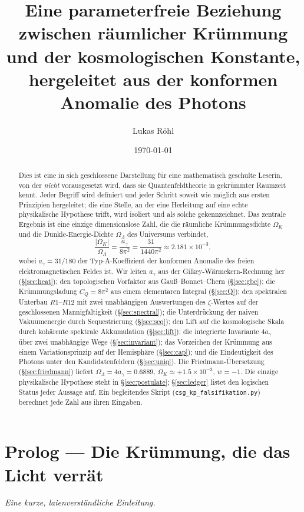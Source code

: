 \documentclass[11pt,a4paper]{article}
\title{Eine parameterfreie Beziehung zwischen räumlicher Krümmung\\
und der kosmologischen Konstante,\\
hergeleitet aus der konformen Anomalie des Photons}
\author{Lukas Röhl}
\date{\today}
\theoremstyle{definition}
\theoremstyle{remark}
\newcommand{\ag}{a_\gamma}
\newcommand{\CQ}{C_Q}
\newcommand{\Ok}{\Omega_K}
\newcommand{\OL}{\Omega_\Lambda}
\begin{document}
\maketitle

\begin{abstract}
Dies ist eine in sich geschlossene Darstellung für eine mathematisch geschulte Leserin, von der
\emph{nicht} vorausgesetzt wird, dass sie Quantenfeldtheorie in gekrümmter Raumzeit kennt. Jeder
Begriff wird definiert und jeder Schritt soweit wie möglich aus ersten Prinzipien hergeleitet; die
eine Stelle, an der eine Herleitung auf eine echte physikalische Hypothese trifft, wird isoliert und
als solche gekennzeichnet. Das zentrale Ergebnis ist eine einzige dimensionslose Zahl, die die
räumliche Krümmungsdichte $\Ok$ und die Dunkle-Energie-Dichte $\OL$ des Universums verbindet,
\[
\frac{\lvert\Ok\rvert}{\OL}=\frac{\ag}{8\pi^2}=\frac{31}{1440\pi^2}\approx 2.181\times10^{-3},
\]
wobei $\ag=31/180$ der Typ-A-Koeffizient der konformen Anomalie des freien elektromagnetischen
Feldes ist. Wir leiten $\ag$ aus der Gilkey-Wärmekern-Rechnung her (\S\ref{sec:heat}); den
topologischen Vorfaktor aus Gauß--Bonnet--Chern (\S\ref{sec:gbc}); die Krümmungsladung
$\CQ=8\pi^2$ aus einem elementaren Integral (\S\ref{sec:Q}); den spektralen Unterbau $R1$--$R12$
mit zwei unabhängigen Auswertungen des $\zeta$-Wertes auf der geschlossenen Mannigfaltigkeit
(\S\ref{sec:spectral}); die Unterdrückung der naiven Vakuumenergie durch Sequestrierung
(\S\ref{sec:seq}); den Lift auf die kosmologische Skala durch kohärente spektrale Akkumulation
(\S\ref{sec:lift}); die integrierte Invariante $4\ag$ über zwei unabhängige Wege
(\S\ref{sec:invariant}); das Vorzeichen der Krümmung aus einem Variationsprinzip auf der
Hemisphäre (\S\ref{sec:cap}); und die Eindeutigkeit des Photons unter den Kandidatenfeldern
(\S\ref{sec:uniq}). Die Friedmann-Übersetzung (\S\ref{sec:friedmann}) liefert $\OL=4\ag=0.6889$,
$\Ok\simeq+1.5\times10^{-3}$, $w=-1$. Die einzige physikalische Hypothese steht in
\S\ref{sec:postulate}; \S\ref{sec:ledger} listet den logischen Status jeder Aussage auf. Ein
begleitendes Skript (\texttt{csg\_kp\_falsifikation.py}) berechnet jede Zahl aus ihren Eingaben.
\end{abstract}

\section*{Prolog --- Die Krümmung, die das Licht verrät}
\textit{Eine kurze, laienverständliche Einleitung.}
\end{document}
